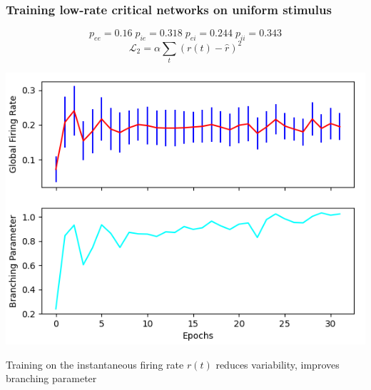 \documentclass{beamer}
\begin{document}
\begin{frame}[plain]
\frametitle{Training low-rate critical networks on uniform stimulus} 

\begin{equation*}
p_{ee} = 0.16 \; p_{ie} = 0.318 \;  p_{ei} = 0.244 \; p_{ii} = 0.343
\end{equation*}
\begin{equation*}
\mathcal{L}_{2} = \alpha\sum_{t} (r(t) - \hat{r})^{2}
\end{equation*}

\begin{center}
\includegraphics[scale=0.5]{alpha-1ms-bin}
\end{center}

Training on the instantaneous firing rate $r(t)$ reduces variability, improves branching parameter

\end{frame}
\end{document}
